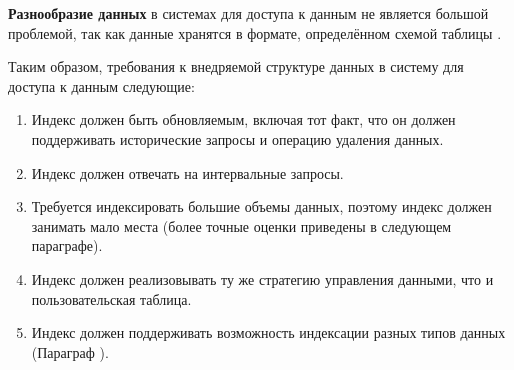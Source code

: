 \textbf{Разнообразие данных} в системах для доступа к данным не является большой проблемой, так как данные хранятся в формате, определённом схемой таблицы \cite{Hudi_SQL_DDL}.

Таким образом, требования к внедряемой структуре данных в систему для доступа к данным следующие:
\begin{enumerate}
    \item Индекс должен быть обновляемым, включая тот факт, что он должен поддерживать исторические запросы и операцию удаления данных.
    \item Индекс должен отвечать на интервальные запросы.
    \item Требуется индексировать большие объемы данных, поэтому индекс должен занимать мало места (более точные оценки приведены в следующем параграфе).
    \item Индекс должен реализовывать ту же стратегию управления данными, что и пользовательская таблица.
    \item Индекс должен поддерживать возможность индексации разных типов данных (Параграф ).
\end{enumerate}
